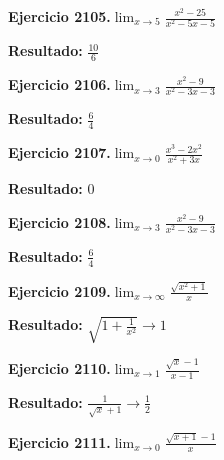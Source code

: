 \documentclass[10pt,a4paper]{article}
\begin{document}
\newpage
\begin{ejbox}
\textbf{Ejercicio 2105.}\quad $\lim_{x\to 5} \frac{x^2-25}{x^2-5x-5}$
\end{ejbox}

\begin{solbox}
\textbf{Resultado:} \(\displaystyle \frac{10}{6}\)
\end{solbox}

\begin{ejbox}
\textbf{Ejercicio 2106.}\quad $\lim_{x\to 3} \frac{x^2-9}{x^2-3x-3}$
\end{ejbox}

\begin{solbox}
\textbf{Resultado:} \(\displaystyle \frac{6}{4}\)
\end{solbox}

\begin{ejbox}
\textbf{Ejercicio 2107.}\quad $\lim_{x\to 0} \frac{x^3-2x^2}{x^2+3x}$
\end{ejbox}

\begin{solbox}
\textbf{Resultado:} \(\displaystyle 0\)
\end{solbox}

\newpage
\begin{ejbox}
\textbf{Ejercicio 2108.}\quad $\lim_{x\to 3} \frac{x^2-9}{x^2-3x-3}$
\end{ejbox}

\begin{solbox}
\textbf{Resultado:} \(\displaystyle \frac{6}{4}\)
\end{solbox}

\begin{ejbox}
\textbf{Ejercicio 2109.}\quad $\lim_{x\to \infty} \frac{\sqrt{x^2+1}}{x}$
\end{ejbox}

\begin{solbox}
\textbf{Resultado:} \(\displaystyle \sqrt{1+\frac{1}{x^2}} \to 1\)
\end{solbox}

\begin{ejbox}
\textbf{Ejercicio 2110.}\quad $\lim_{x\to 1} \frac{\sqrt{x}-1}{x-1}$
\end{ejbox}

\begin{solbox}
\textbf{Resultado:} \(\displaystyle \frac{1}{\sqrt{x}+1} \to \frac{1}{2}\)
\end{solbox}

\newpage
\begin{ejbox}
\textbf{Ejercicio 2111.}\quad $\lim_{x\to 0} \frac{\sqrt{x+1}-1}{x}$
\end{ejbox}
\end{document}
